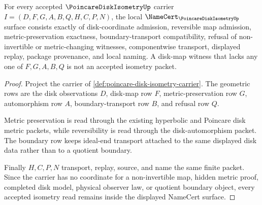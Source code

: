 \begin{theorem}
\label{thm:poincare-disk-isometry-namecert-obligations}
For every accepted $\PoincareDiskIsometryUp$ carrier $I=(D,F,G,A,B,Q,H,C,P,N)$, the local $\NameCert_{\PoincareDiskIsometryUp}$ surface consists exactly of disk-coordinate admission, reversible map admission, metric-preservation exactness, boundary-transport compatibility, refusal of non-invertible or metric-changing witnesses, componentwise transport, displayed replay, package provenance, and local naming. A disk-map witness that lacks any one of $F,G,A,B,Q$ is not an accepted isometry packet.
\end{theorem}
\begin{proof}
Project the carrier of \autoref{def:poincare-disk-isometry-carrier}. The geometric rows are the disk observations $D$, disk-map row $F$, metric-preservation row $G$, automorphism row $A$, boundary-transport row $B$, and refusal row $Q$.

Metric preservation is read through the existing hyperbolic and Poincare disk metric packets, while reversibility is read through the disk-automorphism packet. The boundary row keeps ideal-end transport attached to the same displayed disk data rather than to a quotient boundary.

Finally $H,C,P,N$ transport, replay, source, and name the same finite packet. Since the carrier has no coordinate for a non-invertible map, hidden metric proof, completed disk model, physical observer law, or quotient boundary object, every accepted isometry read remains inside the displayed NameCert surface.
\end{proof}



